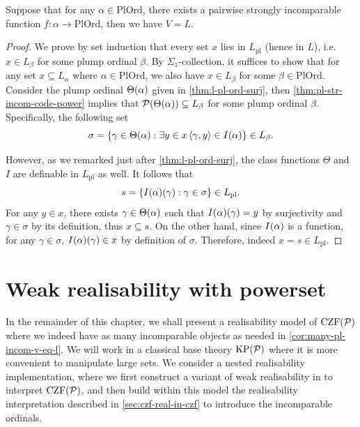 \documentclass[12pt,openany]{book}
\theoremstyle{plain}
\theoremstyle{definition}
\newcommand\tuple[1]{\left\langle #1 \right\rangle}
\newcommand\opE[1]{\mathop{\exists #1}}
\newcommand\Pow{\mathcal{P}}
\newcommand\KPP{\mathrm{KP}\mleft(\Pow\mright)}
\newcommand\CZFP{\mathrm{CZF}\mleft(\Pow\mright)}
\newcommand\IKPP{\mathrm{IKP}\mleft(\Pow\mright)}
\newcommand\PlOrd{\mathrm{PlOrd}}
\newcommand\pl{\mathrm{pl}}
\begin{document}
\begin{corollary}[$\IKPP$]
  \label{cor:many-pl-incom-v-eq-l}
  Suppose that for any $\alpha \in \PlOrd$, there exists a pairwise strongly incomparable function $f : \alpha \rightarrow \PlOrd$, then we have $V = L$.
\end{corollary}

\begin{proof}
  We prove by set induction that every set $x$ lies in $L_\pl$ (hence in $L$), i.e.\ $x \in L_\beta$ for some plump ordinal $\beta$. By $\Sigma_1$-collection, it suffices to show that for any set $x \subseteq L_\alpha$ where $\alpha \in \PlOrd$, we also have $x \in L_\beta$ for some $\beta \in \PlOrd$. Consider the plump ordinal $\Theta\mleft(\alpha\mright)$ given in \autoref{thm:l-pl-ord-surj}, then \autoref{thm:pl-str-incom-code-power} implies that $\Pow\mleft(\Theta\mleft(\alpha\mright)\mright) \subseteq L_\beta$ for some plump ordinal $\beta$. Specifically, the following set
  \[\sigma = \left\{\gamma \in \Theta\mleft(\alpha\mright) : \opE{y \in x} \tuple{\gamma, y} \in I\mleft(\alpha\mright)\right\} \in L_\beta.\]

  However, as we remarked just after \autoref{thm:l-pl-ord-surj}, the class functions $\Theta$ and $I$ are definable in $L_\pl$ as well. It follows that
  \[s = \left\{I\mleft(\alpha\mright)\mleft(\gamma\mright) : \gamma \in \sigma\right\} \in L_\pl.\]
  For any $y \in x$, there exists $\gamma \in \Theta\mleft(\alpha\mright)$ such that $I\mleft(\alpha\mright)\mleft(\gamma\mright) = y$ by surjectivity and $\gamma \in \sigma$ by its definition, thus $x \subseteq s$. On the other hand, since $I\mleft(\alpha\mright)$ is a function, for any $\gamma \in \sigma$, $I\mleft(\alpha\mright)\mleft(\gamma\mright) \in x$ by definition of $\sigma$. Therefore, indeed $x = s \in L_\pl$.
\end{proof}

\section{Weak realisability with powerset}
\label{sec:czf-weak-real}

In the remainder of this chapter, we shall present a realisability model of $\CZFP$ where we indeed have as many incomparable objects as needed in \autoref{cor:many-pl-incom-v-eq-l}. We will work in a classical base theory $\KPP$ where it is more convenient to manipulate large sets. We consider a nested realisability implementation, where we first construct a variant of weak realisability in \cite{rathjen12-czf-powerset} to interpret $\CZFP$, and then build within this model the realisability interpretation described in \autoref{sec:czf-real-in-czf} to introduce the incomparable ordinals.
\end{document}
